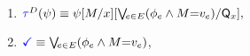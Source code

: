 \begin{multicols}{2}
\begin{enumerate}[topsep=0pt,label=(\textsc{w}\arabic*),ref=\textsc{w}\arabic*]
    
  \item \label{write-tau-ca}
    \begin{math}
      \aTr{\bEvs}{\bForm} \riff
      \bForm
      [\aExp/\aLoc][{\textstyle\bigvee{}\!\!{}_{\aEv\in\aEvs} \PBR{\aForm_\aEv \land \aExp{=}\aVal_\aEv}}/\Q{\aLoc}],
    \end{math}
  \item \label{write-term-ca}
    $\aTerm \riff {\textstyle\bigvee{}\!\!{}_{\aEv\in\aEvs}\PBR{\aForm_\aEv \land \aExp{=}\aVal_\aEv}}$,

\end{enumerate}
\end{multicols}
